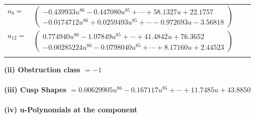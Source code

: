 \documentclass[1p]{elsarticle_modified}
\theoremstyle{definition}
\begin{document}
\begin{tabular}{m{7pt} m{180pt} m{7pt} m{180pt} }
\flushright $a_{8}=$&$\begin{pmatrix}-0.439933 u^{86}-0.447080 u^{85}+\cdots+58.1327 u+22.1757\\-0.0174712 u^{86}+0.0259493 u^{85}+\cdots-0.972693 u-3.56818\end{pmatrix}$ \\
\flushright $a_{12}=$&$\begin{pmatrix}0.774940 u^{86}-1.07849 u^{85}+\cdots+41.4842 u+76.3652\\-0.00285224 u^{86}-0.0798040 u^{85}+\cdots+8.17160 u+2.44523\end{pmatrix}$\\&\end{tabular}
\flushleft \textbf{(ii) Obstruction class $= -1$}\\~\\
\flushleft \textbf{(iii) Cusp Shapes $= 0.00629905 u^{86}-0.167117 u^{85}+\cdots+11.7485 u+43.8850$}\\~\\
\newpage\renewcommand{\arraystretch}{1}
\flushleft \textbf{(iv) u-Polynomials at the component}\newline \\
\end{document}
